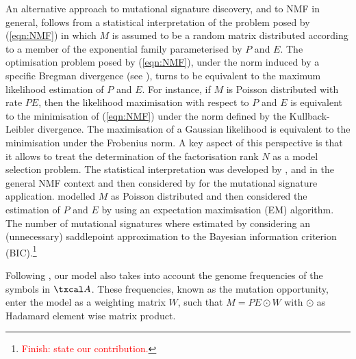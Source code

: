 \documentclass{bioinfo}
\begin{document}
An alternative approach to mutational signature discovery, and to NMF
in general, follows from a statistical interpretation of the problem
posed by (\ref{eqn:NMF}) in which $M$ is assumed to be a random matrix
distributed according to a member of the exponential family
parameterised by $P$ and $E$. The optimisation problem posed by
(\ref{eqn:NMF}), under the norm induced by a specific Bregman
divergence (see \citealp{BMD}), turns to be equivalent to the maximum
likelihood estimation of $P$ and $E$.  For instance, if $M$ is Poisson
distributed with rate $PE$, then the likelihood maximisation with
respect to $P$ and $E$ is equivalent to the minimisation of
(\ref{eqn:NMF}) under the norm defined by the Kullback-Leibler
divergence. The maximisation of a Gaussian likelihood is equivalent to
the minimisation under the Frobenius norm. A key aspect of this
perspective is that it allows to treat the determination of the
factorisation rank $N$ as a model selection problem. The statistical
interpretation was developed by \cite{C}, \cite{FC} and \cite{SWK} in
the general NMF context and then considered by \cite{FICMV} for the
mutational signature application. \cite{FICMV} modelled $M$ as Poisson
distributed and then considered the estimation of $P$ and $E$ by using
an expectation maximisation (EM) algorithm. The number of mutational
signatures where estimated by considering an (unnecessary) saddlepoint
approximation to the Bayesian information criterion
(BIC).\footnote{\textcolor{red}{Finish: state our contribution.}}


Following \cite{FICMV}, our model also takes into account the genome
frequencies of the symbols in $\txcal A$.  These frequencies, known as
the mutation opportunity, enter the model as a weighting matrix $W$, 
such  that $M=PE\odot W$ with $\odot$ as Hadamard element wise
matrix product.

\end{document}
